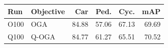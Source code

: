 \begin{tabular}{llrrrr}
\toprule
Run & Objective & Car & Ped. & Cyc. & mAP \\
\midrule
O100 & OGA & 84.88 & 57.06 & 67.13 & 69.69 \\
Q100 & Q-OGA & 84.77 & 61.27 & 65.51 & 70.52 \\
\bottomrule
\end{tabular}
